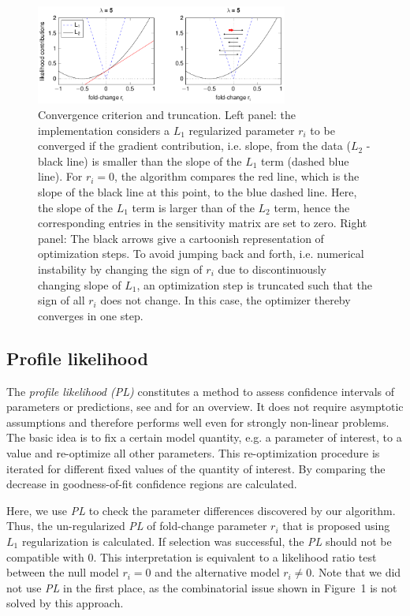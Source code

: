 \documentclass{bioinfo}
\begin{document}
\begin{figure}[!tpb]%
\centerline{\includegraphics[width=235pt]{Figures/l1_cartoon.pdf}}
\caption{Convergence criterion and truncation. Left panel: the implementation considers a $L_1$ regularized parameter $r_i$ to be converged if the gradient contribution, i.e. slope, from the data ($L_2$ - black line) is smaller than the slope of the $L_1$ term (dashed blue line). For $r_i=0$, the algorithm compares the red line, which is the slope of the black line at this point, to the blue dashed line. Here, the slope of the $L_1$ term is larger than of the $L_2$ term, hence the corresponding entries in the sensitivity matrix are set to zero. Right panel: The black arrows give a cartoonish representation of optimization steps. To avoid jumping back and forth, i.e. numerical instability by changing the sign of $r_i$ due to discontinuously changing slope of $L_1$, an optimization step is truncated such that the sign of all $r_i$ does not change. In this case, the optimizer thereby converges in one step.}\label{fig:03}
\end{figure}

\subsection{Profile likelihood}
The \emph{profile likelihood (PL)} constitutes a method to assess confidence intervals of parameters or predictions, see \cite{Raue2009} and \cite{Kreutz2012} for an overview.
It does not require asymptotic assumptions and therefore performs well even for strongly non-linear problems.
The basic idea is to fix a certain model quantity, e.g. a parameter of interest, to a value and re-optimize all other parameters. %
This re-optimization procedure is iterated for different fixed values of the quantity of interest.
By comparing the decrease in goodness-of-fit confidence regions are calculated.

Here, we use \emph{PL} to check the parameter differences discovered by our algorithm.
Thus, the un-regularized \emph{PL} of fold-change parameter $r_i$ that is proposed using $L_1$ regularization is calculated.
If selection was successful, the \emph{PL} should not be compatible with 0.
This interpretation is equivalent to a likelihood ratio test between the null model $r_i=0$ and the alternative model $r_i \neq 0$.
Note that we did not use \emph{PL} in the first place, as the combinatorial issue shown in Figure~1\vphantom{\ref{fig:01}} is not solved by this approach.
\end{document}
